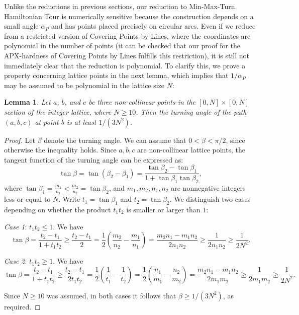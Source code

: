 \documentclass[letterpaper,11pt]{article}
\newtheorem{lemma}{Lemma}
\begin{document}
Unlike the reductions in previous sections,
our reduction to {\sc Min-Max-Turn Hamiltonian Tour} is numerically sensitive
because the construction depends on a small angle $\alpha_P$
and has points placed precisely on circular arcs.
Even if we reduce from a restricted version of
{\sc Covering Points by Lines},
where the coordinates are polynomial in the number of points
(it can be checked that our proof for the APX-hardness of
{\sc Covering Points by Lines} fulfills this restriction),
it is still not immediately clear that the reduction is polynomial.
To clarify this,
we prove a property concerning lattice points in the next lemma,
which implies that $1/\alpha_P$ may be assumed to be polynomial in
the lattice size $N$:

\begin{lemma}\label{lem:lattice}
Let $a$, $b$, and $c$ be three non-collinear points in the $[0,N] \times [0,N]$
section of the integer lattice, where $N \geq 10$. Then the turning
angle of the path $(a,b,c)$ at point $b$ is at least $1/(3 N^2)$.
\end{lemma}
\begin{proof}
Let $\beta$ denote the turning angle. We can assume that $0 < \beta <
\pi/2$, since otherwise the inequality holds.
Since $a,b,c$ are non-collinear lattice points,
the tangent function of the turning angle can be expressed as:
$$
\tan \beta = \tan(\beta_2 - \beta_1) =
\frac{\tan \beta_2 - \tan \beta_1}{1+ \tan \beta_1 \tan \beta_2},
$$
where
$\tan \beta_1 = \frac{m_1}{n_1} < \frac{m_2}{n_2}= \tan \beta_2$,
and $m_1, m_2, n_1, n_2$ are nonnegative integers less or equal to $N$.
Write $t_1= \tan \beta_1$ and $t_2= \tan \beta_2$.
We distinguish two cases depending on whether the product $t_1 t_2$ is
smaller or larger than $1$:

{\em Case 1}: $t_1 t_2 \leq 1$. We have
$$
\tan \beta = \frac{t_2 -t_1}{1 + t_1 t_2} \geq  \frac{t_2 -t_1}{2}
= \frac{1}{2} \left( \frac{m_2}{n_2} - \frac{m_1}{n_1} \right) =
\frac{m_2 n_1 - m_1 n _2}{2n_1 n_2} \geq \frac{1}{2n_1 n_2} \geq
\frac{1}{2 N^2}.
$$

{\em Case 2}: $t_1 t_2 \geq 1$. We have
$$
\tan \beta = \frac{t_2 -t_1}{1 + t_1 t_2} \geq  \frac{t_2 -t_1}{2t_1 t_2}
= \frac{1}{2} \left( \frac{1}{t_1} - \frac{1}{t_2} \right)
= \frac{1}{2} \left( \frac{n_1}{m_1} - \frac{n_2}{m_2} \right) =
\frac{m_2 n_1 - m_1 n _2}{2m_1 m_2} \geq \frac{1}{2m_1 m_2} \geq
\frac{1}{2 N^2}.
$$

Since $N \geq 10$ was assumed,
in both cases it follows that $\beta \geq 1/(3 N^2)$, as required.
\end{proof}
\end{document}
